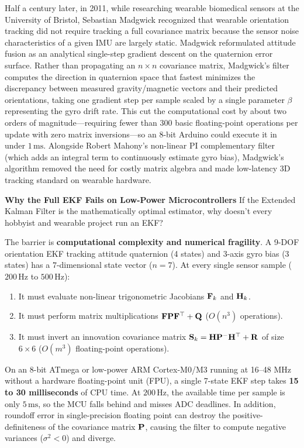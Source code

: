 \begin{historybox}
Half a century later, in 2011, while researching wearable biomedical sensors at the University of Bristol, Sebastian Madgwick recognized that wearable orientation tracking did not require tracking a full covariance matrix because the sensor noise characteristics of a given IMU are largely static. Madgwick reformulated attitude fusion as an analytical single-step gradient descent on the quaternion error surface. Rather than propagating an $n\times n$ covariance matrix, Madgwick's filter computes the direction in quaternion space that fastest minimizes the discrepancy between measured gravity/magnetic vectors and their predicted orientations, taking one gradient step per sample scaled by a single parameter $\beta$ representing the gyro drift rate. This cut the computational cost by about two orders of magnitude---requiring fewer than $300$ basic floating-point operations per update with zero matrix inversions---so an 8-bit Arduino could execute it in under $1\,\text{ms}$. Alongside Robert Mahony's non-linear PI complementary filter (which adds an integral term to continuously estimate gyro bias), Madgwick's algorithm removed the need for costly matrix algebra and made low-latency 3D tracking standard on wearable hardware.
\end{historybox}

\begin{trapbox}
\textbf{Why the Full EKF Fails on Low-Power Microcontrollers}
If the Extended Kalman Filter is the mathematically optimal estimator, why doesn't every hobbyist and wearable project run an EKF?

The barrier is \textbf{computational complexity and numerical fragility}. A 9-DOF orientation EKF tracking attitude quaternion (4 states) and 3-axis gyro bias (3 states) has a $7$-dimensional state vector ($n=7$). At every single sensor sample ($200\,\text{Hz}$ to $500\,\text{Hz}$):
\begin{enumerate}
  \item It must evaluate non-linear trigonometric Jacobians $\mathbf{F}_k$ and $\mathbf{H}_k$.
  \item It must perform matrix multiplications $\mathbf{F}\mathbf{P}\mathbf{F}^\top + \mathbf{Q}$ ($O(n^3)$ operations).
  \item It must invert an innovation covariance matrix $\mathbf{S}_k = \mathbf{H}\mathbf{P}^-\mathbf{H}^\top + \mathbf{R}$ of size $6\times 6$ ($O(m^3)$ floating-point operations).
\end{enumerate}
On an 8-bit ATmega or low-power ARM Cortex-M0/M3 running at 16--48 MHz without a hardware floating-point unit (FPU), a single 7-state EKF step takes \textbf{15 to 30 milliseconds} of CPU time. At $200\,\text{Hz}$, the available time per sample is only $5\,\text{ms}$, so the MCU falls behind and misses ADC deadlines. In addition, roundoff error in single-precision floating point can destroy the positive-definiteness of the covariance matrix $\mathbf{P}$, causing the filter to compute negative variances ($\sigma^2 < 0$) and diverge.
\end{trapbox}

